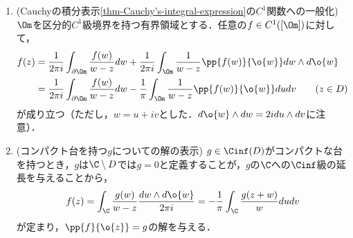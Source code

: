 \documentclass[uplatex, dvipdfmx]{jsreport}
\begin{document}
\begin{lemma}\mbox{}\label{lemma-existence-of-solution-to-PDE-when-compact-support}
    \begin{enumerate}
        \item (Cauchyの積分表示\ref{thm-Cauchy's-integral-expression}の$C^1$関数への一般化) $\Om$を区分的$C^1$級境界を持つ有界領域とする．任意の$f\in C^1([\Om])$に対して，
        \begin{align*}
            f(z)&=\frac{1}{2\pi i}\int_{\partial\Om}\frac{f(w)}{w-z}dw+\frac{1}{2\pi i}\int_\Om\frac{1}{w-z}\pp{f(w)}{\o{w}}dw\wedge d\o{w}\\
            &=\frac{1}{2\pi i}\int_{\partial\Om}\frac{f(w)}{w-z}dw-\frac{1}{\pi}\int_\Om\frac{1}{w-z}\pp{f(w)}{\o{w}}dudv\qquad(z\in D)
        \end{align*}
        が成り立つ（ただし，$w=u+iv$とした．$d\o{w}\wedge dw=2idu\wedge dv$に注意）．
        \item (コンパクト台を持つ$g$についての解の表示) $g\in\Cinf(D)$がコンパクトな台を持つとき，$g$は$\C\setminus D$では$g=0$と定義することが，$g$の$\C$への$\Cinf$級の延長を与えることから，
        \[f(z)=\int_\C\frac{g(w)}{w-z}\frac{dw\wedge d\o{w}}{2\pi i}=-\frac{1}{\pi}\int_\C\frac{g(z+w)}{w}dudv\]
        が定まり，$\pp{f}{\o{z}}=g$の解を与える．
    \end{enumerate}
\end{lemma}
\end{document}
